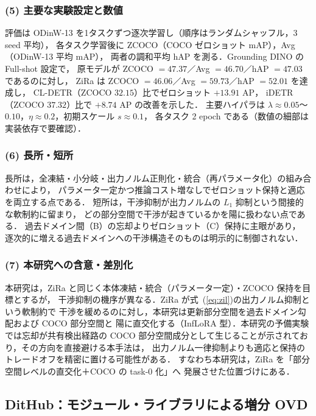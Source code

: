 \subsubsection*{(5) 主要な実験設定と数値}
評価は ODinW-13 を1タスクずつ逐次学習し（順序はランダムシャッフル，3 seed 平均），
各タスク学習後に ZCOCO（COCO ゼロショット mAP），Avg（ODinW-13 平均 mAP），
両者の調和平均 hAP を測る．Grounding DINO の Full-shot 設定で，
原モデルが ZCOCO $=47.37$／Avg $=46.70$／hAP $=47.03$ であるのに対し，
ZiRa は ZCOCO $=46.06$／Avg $=59.73$／hAP $=52.01$ を達成し，
CL-DETR（ZCOCO $32.15$）比でゼロショット $+13.91$ AP，
iDETR（ZCOCO $37.32$）比で $+8.74$ AP の改善を示した．
主要ハイパラは $\lambda \approx 0.05$〜$0.10$，$\eta \approx 0.2$，初期スケール $s \approx 0.1$，
各タスク 2 epoch である（数値の細部は実装依存で要確認）．

\subsubsection*{(6) 長所・短所}
長所は，全凍結・小分岐・出力ノルム正則化・統合（再パラメータ化）の組み合わせにより，
パラメータ一定かつ推論コスト増なしでゼロショット保持と適応を両立する点である．
短所は，干渉抑制が出力ノルムの $L_1$ 抑制という間接的な軟制約に留まり，
どの部分空間で干渉が起きているかを陽に扱わない点である．
過去ドメイン間（B）の忘却よりゼロショット（C）保持に主眼があり，
逐次的に増える過去ドメインへの干渉構造そのものは明示的に制御されない．

\subsubsection*{(7) 本研究への含意・差別化}
本研究は，ZiRa と同じく本体凍結・統合（パラメータ一定）・ZCOCO 保持を目標とするが，
干渉抑制の機序が異なる．ZiRa が式~(\ref{eq:zil})の出力ノルム抑制という軟制約で
干渉を緩めるのに対し，本研究は更新部分空間を過去ドメイン勾配および COCO 部分空間と
陽に直交化する（InfLoRA 型）．本研究の予備実験では忘却が共有検出経路の
COCO 部分空間成分として生じることが示されており，その方向を直接避ける本手法は，
出力ノルム一律抑制よりも適応と保持のトレードオフを精密に置ける可能性がある．
すなわち本研究は，ZiRa を「部分空間レベルの直交化＋COCO の task-0 化」へ
発展させた位置づけにある．

\subsection{DitHub：モジュール・ライブラリによる増分 OVD}
\label{sub:dithub}

